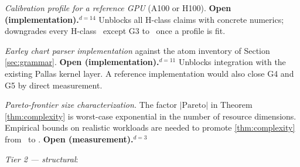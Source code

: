 \begin{description}[nosep,leftmargin=0.8cm]
  \item[G1] \emph{Calibration profile for a reference GPU}
    (A100 or H100). \textbf{Open (implementation).}$^{d=14}$
    Unblocks all \textsf{H}-class claims with concrete
    numerics; downgrades every \textsf{H}-class \gmark\
    except G3 to \cmark\ once a profile is fit.
  \item[G2] \emph{Earley chart parser implementation}
    against the atom inventory of Section \ref{sec:grammar}.
    \textbf{Open (implementation).}$^{d=11}$
    Unblocks integration with the existing Pallas kernel
    layer. A reference implementation would also close
    G4 and G5 by direct measurement.
  \item[G3] \emph{Pareto-frontier size characterization.}
    The factor $|\mathrm{Pareto}|$ in Theorem
    \ref{thm:complexity} is worst-case exponential in
    the number of resource dimensions. Empirical
    bounds on realistic workloads are needed to
    promote \ref{thm:complexity} from \gmark\ to
    \cmark. \textbf{Open (measurement).}$^{d=3}$
\end{description}

\emph{Tier 2 --- structural}:

